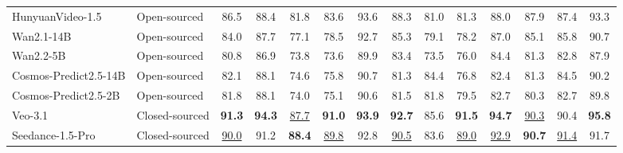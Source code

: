 \begin{table}[H]
\begin{tabular}{l l c cccc | ccccccc}
      HunyuanVideo-1.5 & Open-sourced & 86.5 & 88.4 & 81.8 & 83.6 & 93.6 & 88.3 & 81.0 & 81.3 & 88.0 & 87.9 & 87.4 & 93.3 \\
      Wan2.1-14B & Open-sourced & 84.0 & 87.7 & 77.1 & 78.5 & 92.7 & 85.3 & 79.1 & 78.2 & 87.0 & 85.1 & 85.8 & 90.7 \\
      Wan2.2-5B & Open-sourced & 80.8 & 86.9 & 73.8 & 73.6 & 89.9 & 83.4 & 73.5 & 76.0 & 84.4 & 81.3 & 82.8 & 87.9 \\
      Cosmos-Predict2.5-14B & Open-sourced & 82.1 & 88.1 & 74.6 & 75.8 & 90.7 & 81.3 & 84.4 & 76.8 & 82.4 & 81.3 & 84.5 & 90.2 \\
      Cosmos-Predict2.5-2B & Open-sourced & 81.8 & 88.1 & 74.0 & 75.1 & 90.6 & 81.5 & 81.8 & 79.5 & 82.7 & 80.3 & 82.7 & 89.8 \\
      \midrule
      Veo-3.1 & Closed-sourced & \textbf{91.3} & \textbf{94.3} & \underline{87.7} & \textbf{91.0} & \textbf{93.9} & \textbf{92.7} & 85.6 & \textbf{91.5} & \textbf{94.7} &
\underline{90.3} & 90.4 & \textbf{95.8} \\
      Seedance-1.5-Pro & Closed-sourced & \underline{90.0} & 91.2 & \textbf{88.4} & \underline{89.8} & 92.8 & \underline{90.5} & 83.6 & \underline{89.0} & \underline{92.9} &
\textbf{90.7} & \underline{91.4} & 91.7 \\
      \bottomrule
  \end{tabular}
\end{table}

